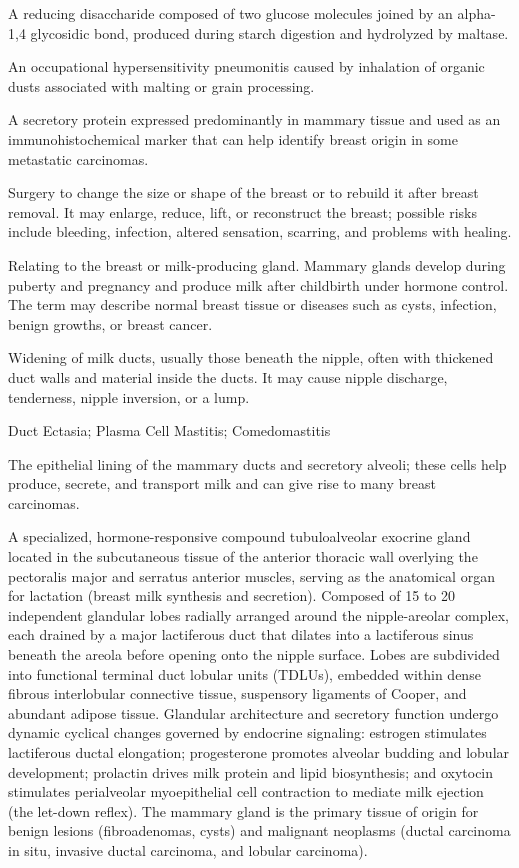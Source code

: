  A reducing disaccharide composed of two glucose molecules joined by an alpha-1,4 glycosidic bond, produced during starch digestion and hydrolyzed by maltase.

 An occupational hypersensitivity pneumonitis caused by inhalation of organic dusts associated with malting or grain processing.

 A secretory protein expressed predominantly in mammary tissue and used as an immunohistochemical marker that can help identify breast origin in some metastatic carcinomas.

 Surgery to change the size or shape of the breast or to rebuild it after breast removal. It may enlarge, reduce, lift, or reconstruct the breast; possible risks include bleeding, infection, altered sensation, scarring, and problems with healing.

 Relating to the breast or milk-producing gland. Mammary glands develop during puberty and pregnancy and produce milk after childbirth under hormone control. The term may describe normal breast tissue or diseases such as cysts, infection, benign growths, or breast cancer.

 Widening of milk ducts, usually those beneath the nipple, often with thickened duct walls and material inside the ducts. It may cause nipple discharge, tenderness, nipple inversion, or a lump.

\synonyms
Duct Ectasia; Plasma Cell Mastitis; Comedomastitis

 The epithelial lining of the mammary ducts and secretory alveoli; these cells help produce, secrete, and transport milk and can give rise to many breast carcinomas.

 A specialized, hormone-responsive compound tubuloalveolar exocrine gland located in the subcutaneous tissue of the anterior thoracic wall overlying the pectoralis major and serratus anterior muscles, serving as the anatomical organ for lactation (breast milk synthesis and secretion). Composed of 15 to 20 independent glandular lobes radially arranged around the nipple-areolar complex, each drained by a major lactiferous duct that dilates into a lactiferous sinus beneath the areola before opening onto the nipple surface. Lobes are subdivided into functional terminal duct lobular units (TDLUs), embedded within dense fibrous interlobular connective tissue, suspensory ligaments of Cooper, and abundant adipose tissue. Glandular architecture and secretory function undergo dynamic cyclical changes governed by endocrine signaling: estrogen stimulates lactiferous ductal elongation; progesterone promotes alveolar budding and lobular development; prolactin drives milk protein and lipid biosynthesis; and oxytocin stimulates perialveolar myoepithelial cell contraction to mediate milk ejection (the let-down reflex). The mammary gland is the primary tissue of origin for benign lesions (fibroadenomas, cysts) and malignant neoplasms (ductal carcinoma in situ, invasive ductal carcinoma, and lobular carcinoma).

